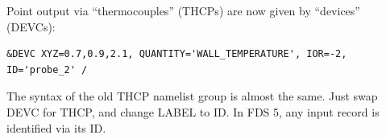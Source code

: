 \documentclass[11pt]{book}
\begin{document}
\noindent
Point output via ``thermocouples'' ({\ct THCP}s) are now given by ``devices'' ({\ct DEVC}s):

\footnotesize
\begin{verbatim}
&DEVC XYZ=0.7,0.9,2.1, QUANTITY='WALL_TEMPERATURE', IOR=-2, ID='probe_2' /
\end{verbatim}
\normalsize

\noindent
The syntax of the old {\ct THCP} namelist group is almost the same. Just swap {\ct DEVC} for {\ct THCP}, and change {\ct LABEL} to
{\ct ID}. In FDS 5, any input record is identified via its {\ct ID}.




\end{document}
